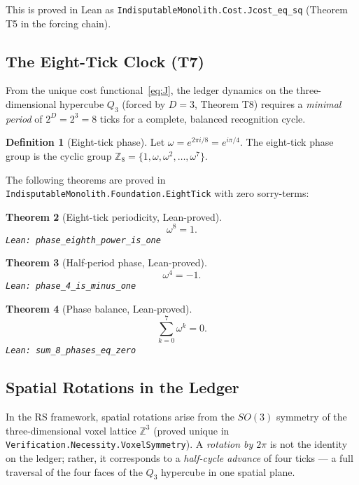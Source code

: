 \documentclass[12pt,a4paper]{article}
\newtheorem{theorem}{Theorem}[section]
\theoremstyle{definition}
\newtheorem{definition}[theorem]{Definition}
\theoremstyle{remark}
\begin{document}
This is proved in Lean as
\texttt{IndisputableMonolith.Cost.Jcost\_eq\_sq} (Theorem T5 in the
forcing chain).

\subsection{The Eight-Tick Clock (T7)}

From the unique cost functional~\eqref{eq:J}, the ledger dynamics on
the three-dimensional hypercube $Q_3$ (forced by $D = 3$, Theorem T8)
requires a \emph{minimal period} of $2^D = 2^3 = 8$ ticks for a
complete, balanced recognition cycle.

\begin{definition}[Eight-tick phase]
Let $\omega = e^{2\pi i / 8} = e^{i\pi/4}$.  The eight-tick phase
group is the cyclic group $\mathbb{Z}_8 = \{1, \omega, \omega^2, \ldots,
\omega^7\}$.
\end{definition}

The following theorems are proved in
\texttt{IndisputableMonolith.Foundation.EightTick} with zero sorry-terms:

\begin{theorem}[Eight-tick periodicity, Lean-proved]\label{thm:period8}
\[
  \omega^8 = 1.
\]
\texttt{Lean: phase\_eighth\_power\_is\_one}
\end{theorem}

\begin{theorem}[Half-period phase, Lean-proved]\label{thm:phase4}
\[
  \omega^4 = -1.
\]
\texttt{Lean: phase\_4\_is\_minus\_one}
\end{theorem}

\begin{theorem}[Phase balance, Lean-proved]\label{thm:sum8}
\[
  \sum_{k=0}^{7} \omega^k = 0.
\]
\texttt{Lean: sum\_8\_phases\_eq\_zero}
\end{theorem}

\subsection{Spatial Rotations in the Ledger}

In the RS framework, spatial rotations arise from the $SO(3)$ symmetry
of the three-dimensional voxel lattice $\mathbb{Z}^3$ (proved unique in
\texttt{Verification.Necessity.VoxelSymmetry}).  A \emph{rotation by
$2\pi$} is not the identity on the ledger; rather, it corresponds to a
\emph{half-cycle advance} of four ticks — a full traversal of the four
faces of the $Q_3$ hypercube in one spatial plane.
\end{document}
